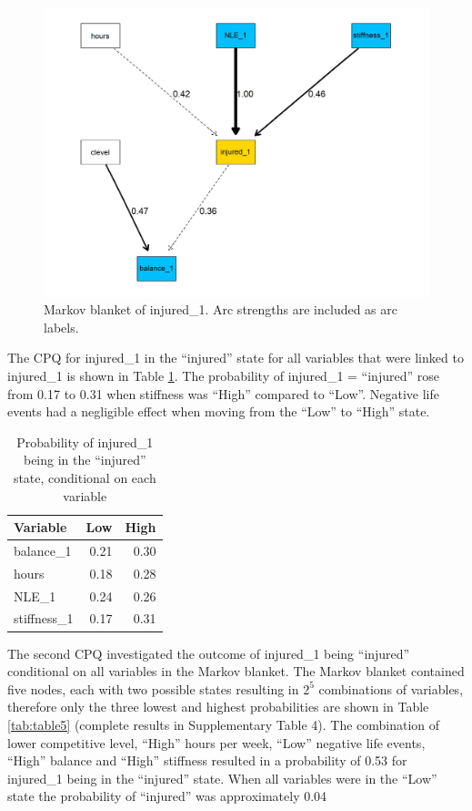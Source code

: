 \documentclass[
  english,
  man]{apa6}
\begin{document}
\begin{figure}

{\centering \includegraphics[width=1\linewidth]{figures_doc/Fig2} 

}

\caption{Markov blanket of injured\_1. Arc strengths are included as arc labels.}\label{fig:fig2}
\end{figure}

The CPQ for injured\_1 in the ``injured'' state for all variables that were linked to injured\_1 is shown in Table \ref{tab:table4}.
The probability of injured\_1 = ``injured'' rose from 0.17 to 0.31 when stiffness was ``High'' compared to ``Low''.
Negative life events had a negligible effect when moving from the ``Low'' to ``High'' state.

\begin{table}[H]

\caption{\label{tab:table4}Probability of injured\_1 being in the ``injured'' state, conditional on each variable}
\centering
\begin{tabular}[t]{l|r|r}
\hline
\textbf{Variable} & \textbf{Low} & \textbf{High}\\
\hline
balance\_1 & 0.21 & 0.30\\
\hline
hours & 0.18 & 0.28\\
\hline
NLE\_1 & 0.24 & 0.26\\
\hline
stiffness\_1 & 0.17 & 0.31\\
\hline
\end{tabular}
\end{table}

The second CPQ investigated the outcome of injured\_1 being ``injured'' conditional on all variables in the Markov blanket.
The Markov blanket contained five nodes, each with two possible states resulting in \(2^5\) combinations of variables, therefore only the three lowest and highest probabilities are shown in Table \ref{tab:table5} (complete results in Supplementary Table 4).
The combination of lower competitive level, ``High'' hours per week, ``Low'' negative life events, ``High'' balance and ``High'' stiffness resulted in a probability of 0.53 for injured\_1 being in the ``injured'' state.
When all variables were in the ``Low'' state the probability of ``injured'' was approximately 0.04
\end{document}
